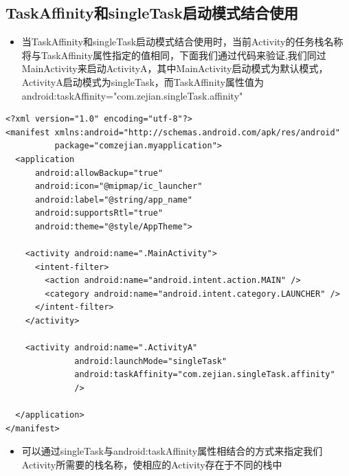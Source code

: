 \documentclass[9pt, b5paaper]{book}
\begin{document}
\subsection{TaskAffinity和singleTask启动模式结合使用}
\label{sec-4-9-1}
\begin{itemize}
\item 当TaskAffinity和singleTask启动模式结合使用时，当前Activity的任务栈名称将与TaskAffinity属性指定的值相同，下面我们通过代码来验证,我们同过MainActivity来启动ActivityA，其中MainActivity启动模式为默认模式，ActivityA启动模式为singleTask，而TaskAffinity属性值为android:taskAffinity="com.zejian.singleTask.affinity"
\end{itemize}
\begin{verbatim}
<?xml version="1.0" encoding="utf-8"?>
<manifest xmlns:android="http://schemas.android.com/apk/res/android"
          package="comzejian.myapplication">
  <application
      android:allowBackup="true"
      android:icon="@mipmap/ic_launcher"
      android:label="@string/app_name"
      android:supportsRtl="true"
      android:theme="@style/AppTheme">

    <activity android:name=".MainActivity">
      <intent-filter>
        <action android:name="android.intent.action.MAIN" />
        <category android:name="android.intent.category.LAUNCHER" />
      </intent-filter>
    </activity>

    <activity android:name=".ActivityA"
              android:launchMode="singleTask"
              android:taskAffinity="com.zejian.singleTask.affinity"
              />
    
  </application>
</manifest>
\end{verbatim}
\begin{itemize}
\item 可以通过singleTask与android:taskAffinity属性相结合的方式来指定我们Activity所需要的栈名称，使相应的Activity存在于不同的栈中
\end{itemize}
\end{document}

